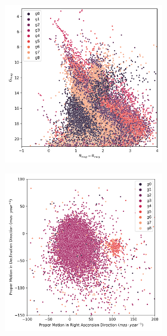 \documentclass[11pt, a4paper, english]{book}
\begin{document}
\begin{figure}[H]
\begin{subfigure}{0.9\textwidth}
\begin{subfigure}[t]{0.30\textwidth}
    \end{subfigure}
    \hfill
    \begin{subfigure}[t]{0.30\textwidth}
      \centering
      \includegraphics[width=\textwidth]{../figures/melotte_25/kmeans_hr_diagram_melotte_25.png}
    \end{subfigure}
  \end{subfigure}
  \caption{Melotte 25 K-Means characterization. Identified as cluster \emph{g4}.}
  \label{fig:result_melotte_25_kmeans}
  \centering
  \begin{subfigure}{0.9\textwidth}
    \centering
    \begin{subfigure}[t]{0.30\textwidth}
      \centering
      \includegraphics[width=\textwidth]{../figures/melotte_25/dec_pm_melotte_25.png}

\end{subfigure}
\end{subfigure}
\end{figure}
\end{document}
